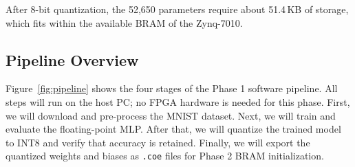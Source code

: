 \documentclass[12pt, letterpaper]{article}
\begin{document}
After 8-bit quantization, the 52,650 parameters require about 51.4\,KB of storage, which fits within the available BRAM of the Zynq-7010.

\subsection{Pipeline Overview}

Figure~\ref{fig:pipeline} shows the four stages of the Phase 1 software pipeline. All steps will run on the host PC; no FPGA hardware is needed for this phase. First, we will download and pre-process the MNIST dataset. Next, we will train and evaluate the floating-point MLP. After that, we will quantize the trained model to INT8 and verify that accuracy is retained. Finally, we will export the quantized weights and biases as \texttt{.coe} files for Phase 2 BRAM initialization.
\end{document}

